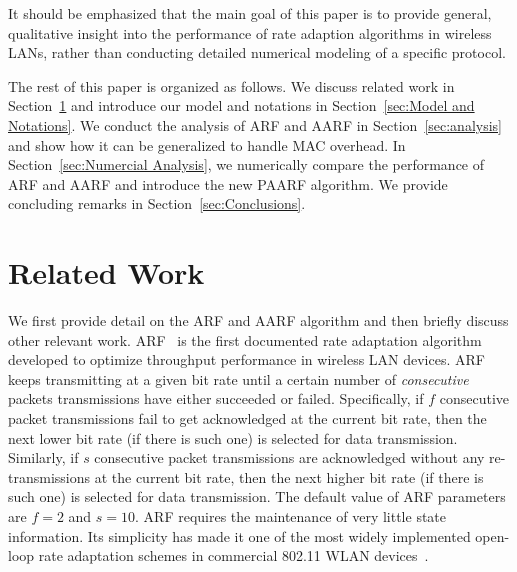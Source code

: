 \documentclass[11pt, journal, letterpaper, oneside, onecolumn]{IEEEtran}
\begin{document}
It should be emphasized that the main goal of this paper is to provide general, qualitative insight
into the performance of rate adaption algorithms in wireless LANs, rather than conducting
detailed numerical modeling of a specific  protocol.

The rest of this paper is organized as follows. We discuss related
work  in Section~\ref{sec:Related Work} and introduce our model
and notations in Section~\ref{sec:Model and Notations}. We conduct
the analysis of ARF and AARF in Section~\ref{sec:analysis} and show how it can be generalized to handle MAC overhead. In Section~\ref{sec:Numercial Analysis}, we numerically compare the
performance of ARF and AARF and introduce the new PAARF algorithm.
We provide concluding remarks in Section~\ref{sec:Conclusions}.




\section {Related Work}
\label{sec:Related Work}

We first provide detail on the ARF and AARF algorithm and then
briefly discuss other relevant work. ARF~\cite{OrgARF} is the first documented rate adaptation
algorithm developed to optimize throughput performance in wireless
LAN devices.
ARF keeps transmitting at a given bit rate until a certain number of
\emph{consecutive} packets transmissions have either succeeded or
failed. Specifically, if $f$ consecutive packet transmissions fail
to get acknowledged at the current bit rate, then the next lower
bit rate (if there is such one) is selected for data transmission.
Similarly, if $s$ consecutive packet transmissions are acknowledged
without any re-transmissions at the current bit rate, then the next
higher bit rate (if there is such one) is selected for data
transmission. The default value of ARF parameters are $f=2$ and
$s=10$. ARF requires the maintenance of very little state
information.
Its simplicity has made it one of the most widely implemented
open-loop rate adaptation schemes in commercial 802.11 WLAN
devices~\cite{CARA}.
\end{document}
